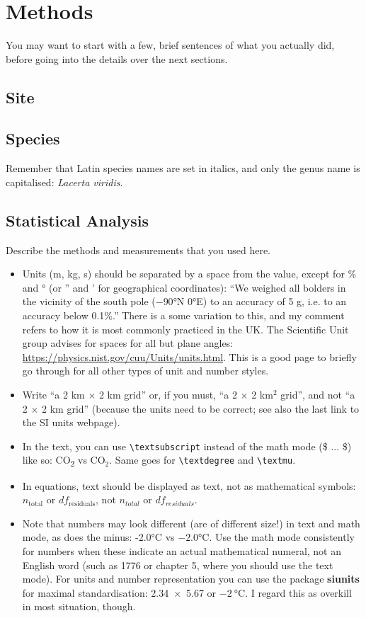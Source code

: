 \chapter{Methods}
\label{ch:methods}
You may want to start with a few, brief sentences of what you actually did, before going into the details over the next sections.

\section{Site}
\section{Species}
 Remember that Latin species names are set in italics, and only the genus name is capitalised: \emph{Lacerta viridis}.
\section{Statistical Analysis}

  Describe the methods and measurements that you used here.

\begin{itemize}
\item Units (m, kg, s) should be separated by a space from the value, except for \% and ° (or '' and ' for geographical coordinates): ``We weighed all bolders in the vicinity of the south pole ($-90$°N $0$°E) to an accuracy of 5 g, i.e. to an accuracy below 0.1\%.'' There is a some variation to this, and my comment refers to how it is most commonly practiced in the UK. The Scientific Unit group advises for spaces for all but plane angles: \url{https://physics.nist.gov/cuu/Units/units.html}. This is a good page to briefly go through for all other types of unit and number styles.

\item Write ``a 2 km $\times$ 2 km grid'' or, if you must, ``a 2 $\times$ 2 km$^2$ grid'', and not ``a 2 $\times$ 2 km grid'' (because the units need to be correct; see also the last link to the SI units webpage).

\item In the text, you can use \texttt{\textbackslash textsubscript} instead of the math mode (\$ ... \$) like so: CO\textsubscript{2} vs CO$_2$. Same goes for \texttt{\textbackslash textdegree} and \texttt{\textbackslash textmu}.

\item In equations, text should be displayed as text, not as mathematical symbols: $n_\text{total}$ or $df_\text{residuals}$, not $n_{total}$ or $df_{residuals}$.

\item Note that numbers may look different (are of different size!) in text and math mode, as does the minus: -2.0°C vs $-2.0$°C. Use the math mode consistently for numbers when these indicate an actual mathematical numeral, not an English word (such as 1776 or chapter 5, where you should use the text mode). For units and number representation you can use the package \textbf{siunits} for maximal standardisation: \num{2.34 x 5.67} or $\SI{-2}{\celsius}$. I regard this as overkill in most situation, though.
\end{itemize}  
 
 